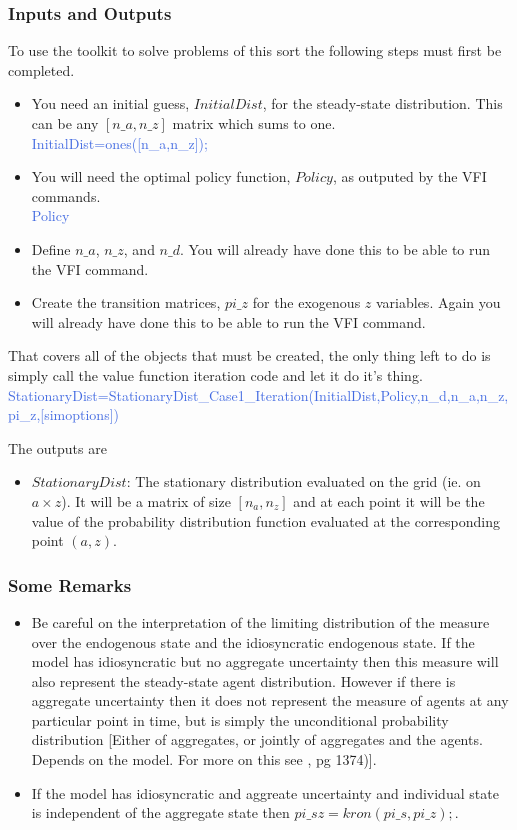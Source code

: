 \subsubsection{Inputs and Outputs}
To use the toolkit to solve problems of this sort the following steps must first be completed.
\begin{itemize}
 \item You need an initial guess, $InitialDist$, for the steady-state distribution. This can be any $[n\_{}a,n\_{}z]$ matrix which sums to one. \\
     \textcolor{RoyalBlue}{InitialDist=ones([n\_{}a,n\_{}z]);}
 \item You will need the optimal policy function, $Policy$, as outputed by the VFI commands. \\
    \textcolor{RoyalBlue}{Policy}
 \item Define $n\_{}a$, $n\_{}z$, and $n\_{}d$. You will already have done this to be able to run the VFI command.
 \item Create the transition matrices, $pi\_{}z$ for the exogenous $z$ variables. Again you will already have done this to be able to run the VFI command.
\end{itemize}

That covers all of the objects that must be created, the only thing left to do is simply call the value function iteration code and let it do it's thing. \\
\textcolor{RoyalBlue}{StationaryDist=StationaryDist\_{}Case1\_{}Iteration(InitialDist,Policy,n\_{}d,n\_{}a,n\_{}z,pi\_{}z,[simoptions]) } 

The outputs are
\begin{itemize}
\item $StationaryDist$: The stationary distribution evaluated on the grid (ie. on $a \times z$). It will be a matrix of size $[n_a,n_z]$ and at each point 
    it will be the value of the probability distribution function evaluated at the corresponding point $(a,z)$.
\end{itemize}

\subsubsection{Some Remarks}
\begin{itemize}
 \item Be careful on the interpretation of the limiting distribution of the measure over the endogenous state and the idiosyncratic endogenous
     state. If the model has idiosyncratic but no aggregate uncertainty then this measure will also represent the steady-state agent distribution. However if there
     is aggregate uncertainty then it does not represent the measure of agents at any particular point in time, but is simply the unconditional probability
     distribution [Either of aggregates, or jointly of aggregates and the agents. Depends on the model. For more on this see \cite{Imrohoroglu1989} , pg 1374)].
 \item If the model has idiosyncratic and aggreate uncertainty and individual state is independent of the aggregate state then $pi\_{}sz=kron(pi\_{}s,pi\_{}z);$.
\end{itemize}


